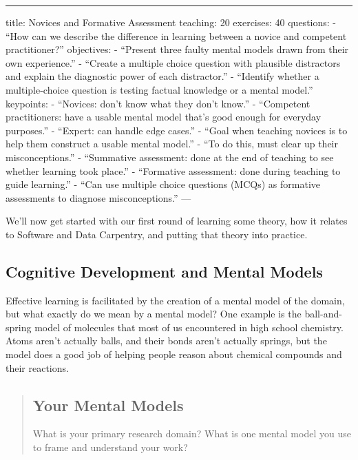 \begin{center}
\rule{3in}{0.4pt}
\end{center}
title: Novices and Formative Assessment
teaching: 20
exercises: 40
questions:
- ``How can we describe the difference in learning between a novice and competent practitioner?''
objectives:
- ``Present three faulty mental models drawn from their own experience.''
- ``Create a multiple choice question with plausible distractors and explain the diagnostic power of each distractor.''
- ``Identify whether a multiple-choice question is testing factual knowledge or a mental model.''
keypoints:
- ``Novices: don't know what they don't know.''
- ``Competent practitioners: have a usable mental model that's good enough for everyday purposes.''
- ``Expert: can handle edge cases.''
- ``Goal when teaching novices is to help them construct a usable mental model.''
- ``To do this, must clear up their misconceptions.''
- ``Summative assessment: done at the end of teaching to see whether learning took place.''
- ``Formative assessment: done during teaching to guide learning.''
- ``Can use multiple choice questions (MCQs) as formative assessments to diagnose misconceptions.''
---

We'll now get started with our first round of learning some theory, how it
relates to Software and Data Carpentry, and putting that theory into practice.

\subsection*{Cognitive Development and Mental Models}

Effective learning is facilitated by the creation of a mental model of the domain,
but what exactly do we mean by a mental model?
One example is the ball-and-spring model of molecules that most of us encountered in high school chemistry.
Atoms aren't actually balls,
and their bonds aren't actually springs,
but the model does a good job of helping people reason about chemical compounds and their reactions.

\begin{quotation}   %
\subsection*{Your Mental Models}

What is your primary research domain?  What is one mental model you use to frame
and understand your work?
\end{quotation}   %

